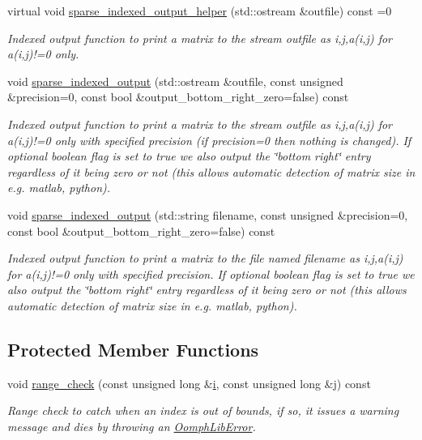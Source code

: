 \begin{DoxyCompactItemize}
virtual void \hyperlink{classoomph_1_1Matrix_a7a5b44e7688ce2c2f7552da104e615c8}{sparse\+\_\+indexed\+\_\+output\+\_\+helper} (std\+::ostream \&outfile) const =0
\begin{DoxyCompactList}\small\item\em Indexed output function to print a matrix to the stream outfile as i,j,a(i,j) for a(i,j)!=0 only. \end{DoxyCompactList}\item 
void \hyperlink{classoomph_1_1Matrix_a4f97fa3c94e6fd664e46acb8873a80f8}{sparse\+\_\+indexed\+\_\+output} (std\+::ostream \&outfile, const unsigned \&precision=0, const bool \&output\+\_\+bottom\+\_\+right\+\_\+zero=false) const
\begin{DoxyCompactList}\small\item\em Indexed output function to print a matrix to the stream outfile as i,j,a(i,j) for a(i,j)!=0 only with specified precision (if precision=0 then nothing is changed). If optional boolean flag is set to true we also output the \char`\"{}bottom right\char`\"{} entry regardless of it being zero or not (this allows automatic detection of matrix size in e.\+g. matlab, python). \end{DoxyCompactList}\item 
void \hyperlink{classoomph_1_1Matrix_ac7473fb07d4db925b4cf3a22131b561a}{sparse\+\_\+indexed\+\_\+output} (std\+::string filename, const unsigned \&precision=0, const bool \&output\+\_\+bottom\+\_\+right\+\_\+zero=false) const
\begin{DoxyCompactList}\small\item\em Indexed output function to print a matrix to the file named filename as i,j,a(i,j) for a(i,j)!=0 only with specified precision. If optional boolean flag is set to true we also output the \char`\"{}bottom right\char`\"{} entry regardless of it being zero or not (this allows automatic detection of matrix size in e.\+g. matlab, python). \end{DoxyCompactList}\end{DoxyCompactItemize}
\subsection*{Protected Member Functions}
\begin{DoxyCompactItemize}
\item 
void \hyperlink{classoomph_1_1Matrix_a2fed2ea1840638eb0ddaa2d4ab1da82f}{range\+\_\+check} (const unsigned long \&\hyperlink{cfortran_8h_adb50e893b86b3e55e751a42eab3cba82}{i}, const unsigned long \&j) const
\begin{DoxyCompactList}\small\item\em Range check to catch when an index is out of bounds, if so, it issues a warning message and dies by throwing an {\ttfamily \hyperlink{classoomph_1_1OomphLibError}{Oomph\+Lib\+Error}}. \end{DoxyCompactList}\end{DoxyCompactItemize}


